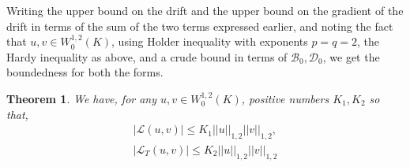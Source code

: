 \documentclass{article}
\theoremstyle{plain}
\newtheorem{theorem}{Theorem}
\theoremstyle{definition}
\theoremstyle{plain}
\newcommand{\D}{\mathcal{D}}
\newcommand{\B}{\mathcal{B}}
\begin{document}
Writing the upper bound on the drift and the upper bound on the gradient of the drift in terms of the sum of the two terms expressed earlier, and noting the fact that $u,v \in W^{1,2}_0 (K)$, using Holder inequality with exponents $p=q=2$, the Hardy inequality as above, and a crude bound in terms of $\B_0, \D_0$, we get the boundedness for both the forms.

\begin{theorem}
    We have, for any $u,v\in W^{1,2}_0 (K)$, positive numbers $K_1, K_2$ so that,
    \begin{align}
      |\mathcal{L}(u,v)|\leq K_1||u||_{1,2}||v||_{1,2}, \\|\mathcal{L}_T(u,v)|\leq K_2||u||_{1,2}||v||_{1,2}
    \end{align}
\end{theorem}
\end{document}
